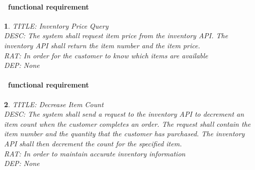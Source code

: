 \documentclass{scrreprt}
\theoremstyle{funreq}
\newtheorem{funreq}{}
\newcommand*{\reqref}[1]{\hyperref[#1]{FR\ref*{#1}}}
\begin{document}
	\paragraph[]{\Subsectionname ~functional requirement }
	\begin{funreq}
		\label{inventory_price}
		TITLE: Inventory Price Query\\
		DESC: The system shall request item price from the inventory API.  The inventory API shall return the item number and the item price.\\
		RAT: In order for the customer to know which items are available\\
		DEP: None\\
	\end{funreq}


	\paragraph[]{\Subsectionname ~functional requirement }
	\begin{funreq}
		\label{inventory_decrement}
		TITLE: Decrease Item Count\\
		DESC: The system shall send a request to the inventory API to decrement an item count when the customer completes an order.  The request shall contain the item number and the quantity that the customer has purchased.  The inventory API shall then decrement the count for the specified item.\\
		RAT: In order to maintain accurate inventory information\\
		DEP: None\\
	\end{funreq}

	
\end{document}
